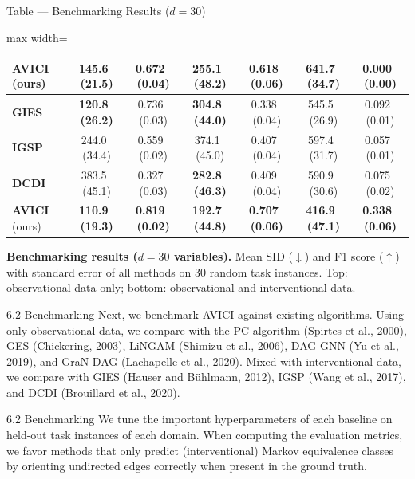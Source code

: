 \documentclass[aspectratio=169,10pt]{beamer}
\newcommand{\err}[1]{\tiny{$\,$(#1)}}
\newcommand{\highlight}[1]{\textbf{#1}}
\newcommand{\oursobserv}{\textbf{AVICI} (ours)}
\newcommand{\gies}{\textbf{GIES}}
\newcommand{\igsp}{\textbf{IGSP}}
\newcommand{\dcdi}{\textbf{DCDI}}
\newcommand{\oursinterv}{\textbf{AVICI} (ours)}
\newcommand{\ours}{AVICI\xspace}
\begin{document}
\begin{frame}{Table --- Benchmarking Results ($d=30$)}
\begin{adjustbox}{max width=\textwidth}
\begin{tabular}{lcccccc}
\oursobserv  &  \highlight{145.6 \err{21.5}} &  \highlight{0.672 \err{0.04}} &  \highlight{255.1 \err{48.2}} &  \highlight{0.618 \err{0.06}}  &  \highlight{641.7 \err{34.7}} &              0.000 \err{0.00} \\
\midrule
\gies              &  \highlight{120.8 \err{26.2}} &              0.736 \err{0.03} &  \highlight{304.8 \err{44.0}} &              0.338 \err{0.04}  &              545.5 \err{26.9} &              0.092 \err{0.01} \\
\igsp              &              244.0 \err{34.4} &              0.559 \err{0.02} &              374.1 \err{45.0} &              0.407 \err{0.04}  &              597.4 \err{31.7} &              0.057 \err{0.01} \\
\dcdi              &              383.5 \err{45.1} &              0.327 \err{0.03} &  \highlight{282.8 \err{46.3}} &              0.409 \err{0.04}  &              590.9 \err{30.6} &              0.075 \err{0.02} \\
\oursinterv &  \highlight{110.9 \err{19.3}} &  \highlight{0.819 \err{0.02}} &  \highlight{192.7 \err{44.8}} &  \highlight{0.707 \err{0.06}}  &  \highlight{416.9 \err{47.1}} &  \highlight{0.338 \err{0.06}} \\
\bottomrule
\end{tabular}
\end{adjustbox}

\vspace{0.2cm}
{\footnotesize {\bf Benchmarking results ($d=30$ variables).} Mean SID ($\downarrow$) and F1 score ($\uparrow$) with standard error of all methods on \num{30} random task instances. Top: observational data only; bottom: observational and interventional data.}
\end{frame}

\begin{frame}{6.2 Benchmarking}
\small
Next, we benchmark \ours against existing algorithms. Using only observational data, we compare with the PC algorithm (Spirtes et al., 2000), GES (Chickering, 2003), LiNGAM (Shimizu et al., 2006), DAG-GNN (Yu et al., 2019), and GraN-DAG (Lachapelle et al., 2020). Mixed with interventional data, we compare with GIES (Hauser and B\"uhlmann, 2012), IGSP (Wang et al., 2017), and DCDI (Brouillard et al., 2020).
\end{frame}

\begin{frame}{6.2 Benchmarking}
We tune the important hyperparameters of each baseline on held-out task instances of each domain. When computing the evaluation metrics, we favor methods that only predict (interventional) Markov equivalence classes by orienting undirected edges correctly when present in the ground truth.
\end{frame}
\end{document}
